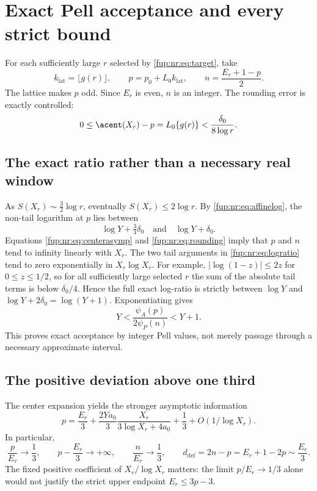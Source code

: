 \documentclass[11pt,letterpaper]{article}
\theoremstyle{definition}\newtheorem{definition}[theorem]{Definition}
\theoremstyle{remark}\newtheorem{remark}[theorem]{Remark}
\begin{document}
\section{Exact Pell acceptance and every strict bound}\label{fup:nr:sec:acceptance}
For each sufficiently large $r$ selected by \eqref{fup:nr:eq:target}, take
\begin{equation}\label{fup:nr:eq:indices}
 k_{\mathrm{lat}}=\lfloor g(r)\rfloor,\qquad
 p=p_0+L_0k_{\mathrm{lat}},\qquad
 n=\frac{E_r+1-p}{2}.
\end{equation}
The lattice makes $p$ odd. Since $E_r$ is even, $n$ is an integer. The rounding error is exactly controlled:
\begin{equation}\label{fup:nr:eq:rounding}
 0\le\acent(X_r)-p=L_0\{g(r)\}
 <\frac{\delta_0}{8\log r}.
\end{equation}

\subsection{The exact ratio rather than a necessary real window}
As $S(X_r)\sim\tfrac32\log r$, eventually $S(X_r)\le2\log r$. By \eqref{fup:nr:eq:affinelog}, the non-tail logarithm at $p$ lies between
\[
 \log Y+\tfrac34\delta_0\quad\text{and}\quad\log Y+\delta_0.
\]
Equations \eqref{fup:nr:eq:centerasymp} and \eqref{fup:nr:eq:rounding} imply that $p$ and $n$ tend to infinity linearly with $X_r$. The two tail arguments in \eqref{fup:nr:eq:logratio} tend to zero exponentially in $X_r\log X_r$. For example, $|\log(1-z)|\le2z$ for $0\le z\le1/2$, so for all sufficiently large selected $r$ the sum of the absolute tail terms is below $\delta_0/4$. Hence the full exact log-ratio is strictly between $\log Y$ and $\log Y+2\delta_0=\log(Y+1)$. Exponentiating gives
\begin{equation}\label{fup:nr:eq:exactratio}
 Y<\frac{\psi_A(p)}{2\psi_P(n)}<Y+1.
\end{equation}
This proves exact acceptance by integer Pell values, not merely passage through a necessary approximate interval.

\subsection{The positive deviation above one third}
The center expansion yields the stronger asymptotic information
\begin{equation}\label{fup:nr:eq:pdev}
 p=\frac{E_r}3+
 \frac{2Ya_0}3\frac{X_r}{3\log X_r+4a_0}+\frac13+O(1/\log X_r).
\end{equation}
In particular,
\begin{equation}\label{fup:nr:eq:ratios}
 \frac p{E_r}\longrightarrow\frac13,\qquad
 p-\frac{E_r}3\longrightarrow+\infty,\qquad
 \frac n{E_r}\longrightarrow\frac13,
 \qquad d_{\mathrm{def}}=2n-p=E_r+1-2p\sim\frac{E_r}3.
\end{equation}
The fixed positive coefficient of $X_r/\log X_r$ matters: the limit $p/E_r\to1/3$ alone would not justify the strict upper endpoint $E_r\le3p-3$.
\end{document}
